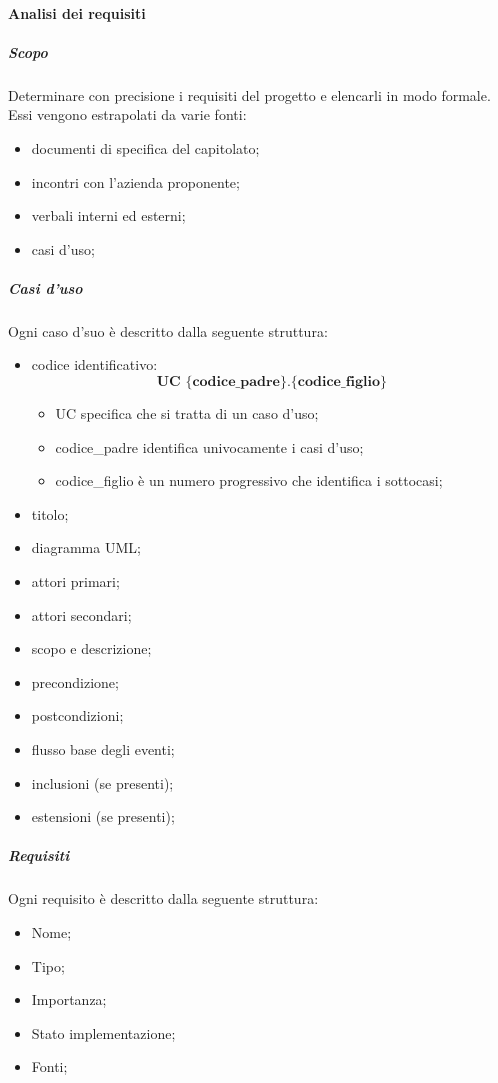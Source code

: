 \paragraph{Analisi dei requisiti}
\subparagraph{Scopo}\Spazio
Determinare con precisione i requisiti del progetto e elencarli in modo formale. Essi vengono estrapolati da varie fonti:
\begin{itemize}
	\item documenti di specifica del capitolato; 	
	\item incontri con l'azienda proponente; 	
	\item verbali interni ed esterni; 	
	\item casi d'uso; 	
\end{itemize}
\subparagraph{Casi d'uso}\Spazio
Ogni caso d'suo è descritto dalla seguente struttura:
\begin{itemize}
	\item codice identificativo: $$ \textbf{UC \{codice\_padre\}.\{codice\_figlio\}  } $$ 
		\begin{itemize}
				\item UC specifica che si tratta di un caso d'uso; 	
				\item codice\_padre identifica univocamente i casi d'uso; 	
				\item codice\_figlio è un numero progressivo che identifica i sottocasi; 	
		\end{itemize}		
	\item titolo; 	
	\item diagramma UML; 	
	\item attori primari; 	
	\item attori secondari; 	
	\item scopo e descrizione; 	
	\item precondizione; 	
	\item postcondizioni; 	
	\item flusso base degli eventi; 	
	\item inclusioni (se presenti); 	
	\item estensioni (se presenti); 	
\end{itemize}
\subparagraph{Requisiti}\Spazio
Ogni requisito è descritto dalla seguente struttura:
\begin{itemize}
	\item Nome; 	
	\item Tipo; 	
	\item Importanza; 	
	\item Stato implementazione; 	
	\item Fonti; 	
\end{itemize}

